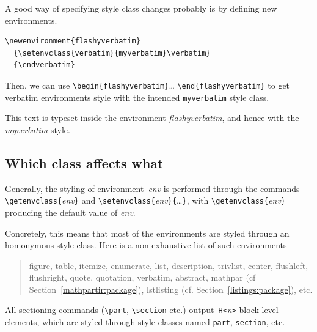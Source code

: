 A good way of specifying style class changes probably is by defining
new environments.
\begin{verbatim}
\newenvironment{flashyverbatim}
  {\setenvclass{verbatim}{myverbatim}\verbatim}
  {\endverbatim}
\end{verbatim}
\newenvironment{flashyverbatim}
  {\setenvclass{verbatim}{myverbatim}\verbatim}
  {\endverbatim}%
Then, we can use \verb+\begin{flashyverbatim}+\ldots{}
\verb+\end{flashyverbatim}+ to get verbatim environments style with
the intended \texttt{myverbatim} style class.
\begin{htmlonly}\begin{flashyverbatim}
This text is typeset inside the environment
\emph{flashyverbatim}, and hence with the \emph{myverbatim}
style.
\end{flashyverbatim}
\end{htmlonly}

\subsection{Which class affects\label{whatclass} what}

Generally, the styling of environment~\textit{env} is performed through
the commands
\verb+\getenvclass{+\textit{env}\verb+}+
and \verb+\setenvclass{+\textit{env}\verb+}{+\ldots\verb+}+,
with \verb+\getenvclass{+\textit{env}\verb+}+ producing the
default value of \textit{env}.

Concretely, this means that most of the environments are styled through
an homonymous style class. Here is a non-exhaustive list of such
environments
\begin{quote}
figure, table, itemize, enumerate, list, description, 
trivlist, center, flushleft, flushright, quote,
quotation, verbatim, abstract, mathpar (cf
Section~\ref{mathpartir:package}), lstlisting
(cf. Section~\ref{listings:package}), etc.
\end{quote}

All sectioning commands (\verb+\part+, \verb+\section+ etc.)
output~\verb+H<+\textit{n}\verb+>+ block-level  elements, which are styled
through style classes named \texttt{part}, \texttt{section}, etc.

